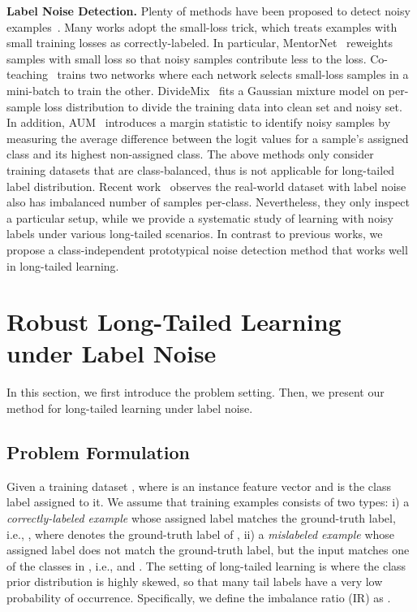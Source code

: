 \documentclass{article}
\begin{document}
\textbf{Label Noise Detection.} Plenty of methods have been proposed to detect noisy examples~\cite{jiang2018mentornet,han2018co,li2020dividemix,Nguyen2020self}. Many works adopt the small-loss trick, which treats examples with small training losses as correctly-labeled. In particular, MentorNet~\cite{jiang2018mentornet} reweights samples with small loss so that noisy samples contribute less to the loss.  Co-teaching~\cite{han2018co} trains two networks where each network selects small-loss samples in a mini-batch to train the other. DivideMix~\cite{li2020dividemix} fits a Gaussian mixture model on per-sample loss distribution to divide the training data into clean set and noisy set. In addition, AUM~\cite{pleiss2020identifying} introduces a margin statistic to identify noisy samples by measuring the average difference between the logit values for a sample's assigned class and its highest non-assigned class. The above methods only consider training datasets that are class-balanced, thus is not applicable for long-tailed label distribution. Recent work~\cite{li2021mopro} observes the real-world dataset with label noise also has imbalanced number of samples per-class. Nevertheless, they only inspect a particular setup, while we provide a systematic study of learning with noisy labels under various long-tailed scenarios. In contrast to previous works, we propose a class-independent prototypical noise detection method that works well in long-tailed learning.



 
\section{Robust Long-Tailed Learning under Label Noise}\label{sec:method}
In this section, we first introduce the problem setting. Then, we present our method for long-tailed learning under label noise. 

\subsection{Problem Formulation}
Given a training dataset , where  is an instance feature vector and  is the class label assigned to it. We assume that training examples  consists of two types: i) a \textit{correctly-labeled example} whose assigned label matches the ground-truth label, i.e., , where  denotes the ground-truth label of , ii) a \textit{mislabeled example} whose assigned label does not match the ground-truth label, but the input matches one of the classes in , i.e.,  and . The setting of long-tailed learning is where the class prior distribution  is highly skewed, so that many tail labels have a very low probability of occurrence. Specifically, we define the imbalance ratio (IR) as .
\end{document}
